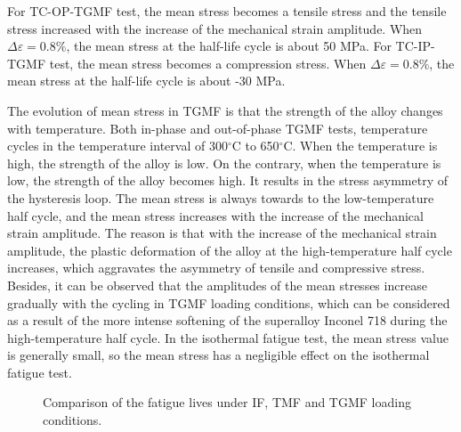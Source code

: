 \documentclass[preprint,5p,twocolumn,11pt,sort&compress]{elsarticle}
\begin{document}
For TC-OP-TGMF test, the mean stress becomes a tensile stress and the tensile stress increased with the increase of the mechanical strain amplitude.
When $\Delta \varepsilon=0.8\%$, the mean stress at the half-life cycle is about 50 MPa. For TC-IP-TGMF test, the mean stress becomes a compression stress. When $\Delta \varepsilon=0.8\%$, the mean stress at the half-life cycle is about -30 MPa.

The evolution of mean stress in TGMF is that the strength of the alloy changes with temperature. Both in-phase and out-of-phase TGMF tests, temperature cycles in the temperature interval of 300$^\circ$C to 650$^\circ$C. When the temperature is high, the strength of the alloy is low. On the contrary, when the temperature is low, the strength of the alloy becomes high. It results in the stress asymmetry of the hysteresis loop. The mean stress is always towards to the low-temperature half cycle, and the mean stress increases with the increase of the mechanical strain amplitude.
The reason is that with the increase of the mechanical strain amplitude, the plastic deformation of the alloy at the high-temperature half cycle increases, which aggravates the asymmetry of tensile and compressive stress.
Besides, it can be observed that the amplitudes of the mean stresses increase gradually with the cycling in TGMF loading conditions, which can be considered as a result of the more intense softening of the superalloy Inconel 718 during the high-temperature half cycle. In the isothermal fatigue test, the mean stress value is generally small, so the mean stress has a negligible effect on the isothermal fatigue test.

\begin{figure}[!htp]
\caption{Comparison of the fatigue lives under IF, TMF and TGMF loading conditions.}
\label{Fig:plot_exp_fatigue_life_TGMF}
\end{figure}
\end{document}
